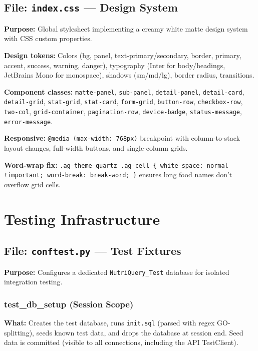 \documentclass[12pt,a4paper]{article}
\begin{document}
\subsection{File: \texttt{index.css} — Design System}

\textbf{Purpose:} Global stylesheet implementing a creamy white matte design system with CSS custom properties.

\textbf{Design tokens:} Colors (bg, panel, text-primary/secondary, border, primary, accent, success, warning, danger), typography (Inter for body/headings, JetBrains Mono for monospace), shadows (sm/md/lg), border radius, transitions.

\textbf{Component classes:} \texttt{matte-panel}, \texttt{sub-panel}, \texttt{detail-panel}, \texttt{detail-card}, \texttt{detail-grid}, \texttt{stat-grid}, \texttt{stat-card}, \texttt{form-grid}, \texttt{button-row}, \texttt{checkbox-row}, \texttt{two-col}, \texttt{grid-container}, \texttt{pagination-row}, \texttt{device-badge}, \texttt{status-message}, \texttt{error-message}.

\textbf{Responsive:} \texttt{@media (max-width: 768px)} breakpoint with column-to-stack layout changes, full-width buttons, and single-column grids.

\textbf{Word-wrap fix:} \texttt{.ag-theme-quartz .ag-cell \{ white-space: normal !important; word-break: break-word; \}} ensures long food names don't overflow grid cells.

\section{Testing Infrastructure}

\subsection{File: \texttt{conftest.py} — Test Fixtures}

\textbf{Purpose:} Configures a dedicated \texttt{NutriQuery\_Test} database for isolated integration testing.

\subsubsection{test\_db\_setup (Session Scope)}
\textbf{What:} Creates the test database, runs \texttt{init.sql} (parsed with regex GO-splitting), seeds known test data, and drops the database at session end. Seed data is committed (visible to all connections, including the API TestClient).
\end{document}

